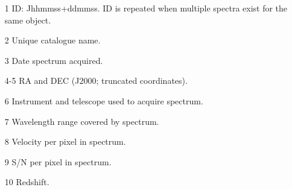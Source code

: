 \begin{itemize}

\item[1] ID: Jhhmmss+ddmmss. ID is repeated when multiple spectra exist for the same object. 

\item[2] Unique catalogue name.   

\item[3] Date spectrum acquired. 

\item[4-5] RA and DEC (J$2000$; truncated coordinates).  

\item[6] Instrument and telescope used to acquire spectrum. 

\item[7] Wavelength range covered by spectrum. 

\item[8] Velocity per pixel in spectrum. 

\item[9] S/N per pixel in spectrum. 

\item[10] Redshift. 

\end{itemize}

